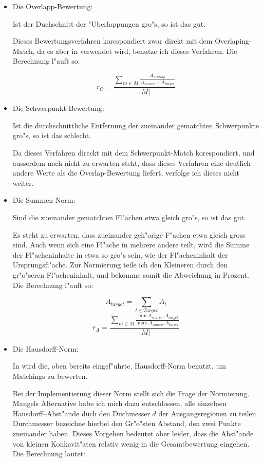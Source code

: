 \begin{itemize}
\item Die Overlapp-Bewertung: 

Ist der Duchschnitt der "Uberlappungen gro"s, so ist das gut.

Dieses Bewertungsverfahren korespondiert zwar direkt mit dem Overlaping-Match, da es aber in \cite{AFRW} verwendet wird, benutze ich dieses Verfahren. Die Berechnung l"auft so:

$$r_O=\frac{\sum_{m\in M} \frac{A_{overlap}}{A_{source}+A_{target}}}{|M|}$$

\item Die Schwerpunkt-Bewertung:

Ist die durchschnittliche Entfernung der zueinander gematchten Schwerpunkte gro"s, so ist das schlecht.

Da dieses Verfahren direckt mit dem Schwerpunkt-Match korespondiert, und ausserdem nach \cite{AFRW} nicht zu erwarten steht, dass dieses Verfahren eine deutlich andere Werte als die Overlap-Bewertung liefert, verfolge ich dieses nicht weiter.

\item Die Summen-Norm:

Sind die zueinander gematchten Fl"achen etwa gleich gro"s, so ist das gut. 

Es steht zu erwarten, dass zueinander geh"orige F"achen etwa gleich gross sind. Auch wenn sich eine Fl"ache in mehrere andere teilt, wird die Summe der Fl"acheninhalte in etwa so gro"s sein, wie der Fl"acheninhalt der Ursprungsfl"ache. Zur Normierung teile ich den Kleineren durch den gr"o"seren Fl"acheninhalt, und bekomme somit die Abweichung in Prozent. Die Berechnung l"auft so:

$$A_{target}=\sum_{t\in Target}A_t$$
$$r_A=\frac {\sum_{m\in M}\frac{\min{A_{source},A_{target}}}{\max{A_{source},A_{target}}}}{|M|}$$

\item Die Hausdorff-Norm:

In \cite{AAR} wird die,  oben bereits eingef"uhrte, Hausdorff-Norm benutzt, um Matchings zu bewerten. 

Bei der Implementierung dieser Norm stellt sich die Frage der Normierung. Mangels Alternative habe ich mich dazu entschlossen, alle einzelnen Hausdorff--Abst"ande duch den Duchmesser $d$ der Ausgangsregionen zu teilen.  Durchmesser bezeichne hierbei den Gr"o"sten Abstand, den zwei Punkte zueinander haben. Dieses Vorgehen bedeutet aber leider, dass die Abst"ande von kleinen Konkavit"aten relativ wenig in die Gesamtbewertung eingehen. Die Berechnung lautet:


\end{itemize}
